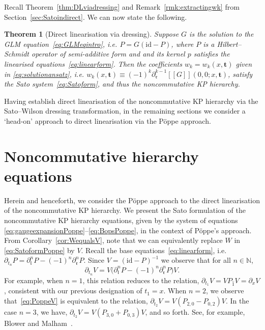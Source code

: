 \documentclass[5p,twocolumn]{elsarticle}
\newcommand*{\id}{{\mathrm{id}}}
\newcommand*{\pa}{{\partial}}
\newcommand*{\lb}{[\![}
\newcommand*{\rb}{]\!]}
\newcommand*{\tbf}{\boldsymbol{t}}
\newcommand*{\el}{\mathfrak l}
\newcommand*{\rl}{\mathfrak r}
\newtheorem{theorem}{Theorem}
\begin{document}
%
Recall Theorem~\ref{thm:DLviadressing} and Remark~\ref{rmk:extractingwk} from Section~\ref{sec:Satoindirect}. We can now state the following.
%
\begin{theorem}[Direct linearisation via dressing]\label{thm:first}
  Suppose $G$ is the solution to the GLM equation~\eqref{eq:GLMeqintro}, i.e.\/ $P=G(\id-P)$, where $P$ is a Hilbert--Schmidt operator of semi-additive form
  and and its kernel $p$ satisfies the linearised equations~\eqref{eq:linearform}.
  Then the coefficients $w_k=w_k(x,\tbf)$ given in \eqref{eq:solutionansatz}, i.e. $w_k(x,\tbf)\equiv(-1)^{k}\pa^{k-1}_{\rl}\lb G\rb(0,0;x,\tbf)$,
  satisfy the Sato system~\eqref{eq:Satoform}, and thus the noncommutative KP hierarchy.
\end{theorem}
%
Having establish direct linearisation of the noncommutative KP hierarchy via the Sato--Wilson dressing transformation,
in the remaining sections we consider a `head-on' approach to direct linearisation via the P\"oppe approach.



\section{Noncommutative hierarchy equations}\label{sec:hierarchyequations}
Herein and henceforth, we consider the P\"oppe approach to the direct linearisation of the noncommutative KP hierarchy.
We present the Sato formulation of the noncommutative KP hierarchy equations, given by the system of equations \eqref{eq:gaugeexpansionPoppe}--\eqref{eq:BopsPoppe}, in the context of P\"oppe's approach.
From Corollary~\ref{cor:WequalsV}, note that we can equivalently replace $W$ in \eqref{eq:SatoformPoppe} by $V$.
Recall the base equations~\eqref{eq:linearform}, i.e.\/ $\pa_{t_n}P=\pa_{\el}^nP-(-1)^n\pa_{\rl}^nP$.
Since $V=(\id-P)^{-1}$ we observe that for all $n\in\mathbb N$,
\begin{equation}\label{eq:PoppeV}
  \pa_{t_n}V=V\bigl(\pa_{\el}^nP-(-1)^n\pa_{\rl}^nP\bigr)V.
\end{equation}
For example, when $n=1$, this relation reduces to the relation, $\pa_{t_1}V=V P_{\hat 1}V=\pa_x V$, consistent with our previous designation of $t_1=x$.
When $n=2$, we observe that~\eqref{eq:PoppeV} is equivalent to the relation, $\pa_{t_2}V=V(P_{2,0}-P_{0,2})V$.
In the case $n=3$, we have, $\pa_{t_2}V=V(P_{3,0}+P_{0,3})V$, and so forth. See, for example, Blower and Malham~\cite{BM-KP}.
\end{document}
